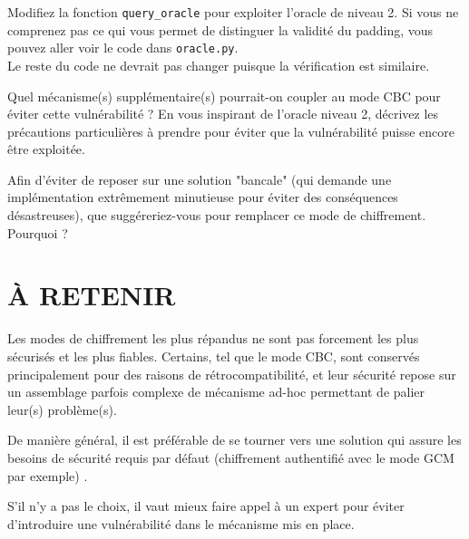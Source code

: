 \documentclass[french,a4paper,11pt]{exam}
\begin{document}
\begin{questions}

	\question Modifiez la fonction \texttt{query\_oracle} pour exploiter l'oracle de niveau 2. Si vous ne comprenez pas ce qui vous permet de distinguer la validité du padding, vous pouvez aller voir le code dans \texttt{oracle.py}.\\
	Le reste du code ne devrait pas changer puisque la vérification est similaire.
	
	\question Quel mécanisme(s) supplémentaire(s) pourrait-on coupler au mode CBC pour éviter cette vulnérabilité ? En vous inspirant de l'oracle niveau 2, décrivez les précautions particulières à prendre pour éviter que la vulnérabilité puisse encore être exploitée.
	
	\question Afin d'éviter de reposer sur une solution "bancale" (qui demande une implémentation extrêmement minutieuse pour éviter des conséquences désastreuses), que suggéreriez-vous pour remplacer ce mode de chiffrement. Pourquoi ?
	
	\end{questions}

	\section*{À RETENIR}

	Les modes de chiffrement les plus répandus ne sont pas forcement les plus sécurisés et les plus fiables. Certains, tel que le mode CBC, sont conservés principalement pour des raisons de rétrocompatibilité, et leur sécurité repose sur un assemblage parfois complexe de mécanisme ad-hoc permettant de palier leur(s) problème(s).

	De manière général, il est préférable de se tourner vers une solution qui assure les besoins de sécurité requis par défaut (chiffrement authentifié avec le mode GCM par exemple) . 

	S'il n'y a pas le choix, il vaut mieux faire appel à un expert pour éviter d'introduire une vulnérabilité dans le mécanisme mis en place.
	
\end{document}
